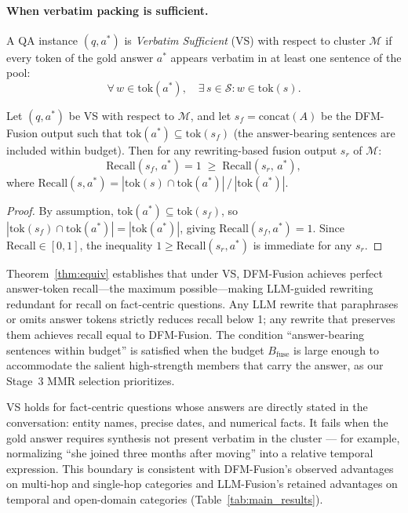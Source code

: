 \paragraph{When verbatim packing is sufficient.}

\begin{definition}
\label{def:vs}
A QA instance $(q, a^*)$ is \emph{Verbatim Sufficient} (VS) with respect to cluster $\mathcal{M}$ if every token of the gold answer $a^*$ appears verbatim in at least one sentence of the pool:
\[
  \forall\, w \in \mathrm{tok}(a^*),\quad \exists\, s \in \mathcal{S} : w \in \mathrm{tok}(s).
\]
\end{definition}

\begin{theorem}
\label{thm:equiv}
Let $(q, a^*)$ be VS with respect to $\mathcal{M}$, and let $s_f = \mathrm{concat}(A)$ be the DFM-Fusion output such that $\mathrm{tok}(a^*) \subseteq \mathrm{tok}(s_f)$ (the answer-bearing sentences are included within budget).
Then for any rewriting-based fusion output $s_r$ of $\mathcal{M}$:
\[
  \mathrm{Recall}(s_f,\, a^*) = 1 \;\geq\; \mathrm{Recall}(s_r,\, a^*),
\]
where $\mathrm{Recall}(s, a^*) = |\mathrm{tok}(s) \cap \mathrm{tok}(a^*)| \,/\, |\mathrm{tok}(a^*)|$.
\end{theorem}
\begin{proof}
By assumption, $\mathrm{tok}(a^*) \subseteq \mathrm{tok}(s_f)$, so $|\mathrm{tok}(s_f) \cap \mathrm{tok}(a^*)| = |\mathrm{tok}(a^*)|$, giving $\mathrm{Recall}(s_f, a^*) = 1$.
Since $\mathrm{Recall} \in [0,1]$, the inequality $1 \geq \mathrm{Recall}(s_r, a^*)$ is immediate for any $s_r$.
\end{proof}

Theorem~\ref{thm:equiv} establishes that under VS, DFM-Fusion achieves perfect answer-token recall---the maximum possible---making LLM-guided rewriting redundant for recall on fact-centric questions.
Any LLM rewrite that paraphrases or omits answer tokens strictly reduces recall below 1; any rewrite that preserves them achieves recall equal to DFM-Fusion.
The condition ``answer-bearing sentences within budget'' is satisfied when the budget $B_{\mathrm{fuse}}$ is large enough to accommodate the salient high-strength members that carry the answer, as our Stage~3 MMR selection prioritizes.

\begin{remark}
\label{rem:vs_boundary}
VS holds for fact-centric questions whose answers are directly stated in the conversation: entity names, precise dates, and numerical facts.
It fails when the gold answer requires synthesis not present verbatim in the cluster --- for example, normalizing ``she joined three months after moving'' into a relative temporal expression.
This boundary is consistent with DFM-Fusion's observed advantages on multi-hop and single-hop categories and LLM-Fusion's retained advantages on temporal and open-domain categories (Table~\ref{tab:main_results}).
\end{remark}

